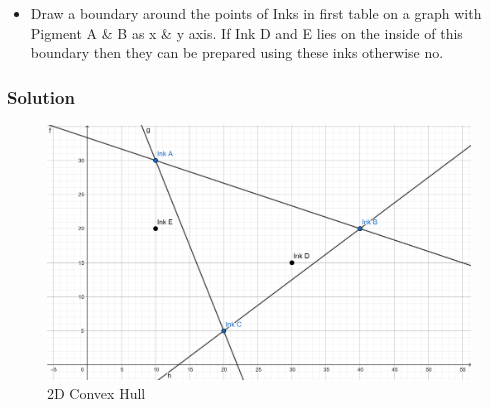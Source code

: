 \documentclass{beamer}
\begin{document}
\begin{frame}
    \begin{itemize}
        \item Draw a boundary around the points of Inks in first table on a graph with Pigment A \& B as x \& y axis. If Ink D and E lies on the inside of this boundary then they can be prepared using these inks otherwise no.\\
    \end{itemize}
    \frametitle{Solution}
      \begin{center}
     \begin{figure}[H]
        \caption{2D Convex Hull}
        \centering
        \includegraphics[scale=0.1]{convex_hull_intro.png}
        \end{figure}
    \end{center}
\end{frame}
\end{document}
